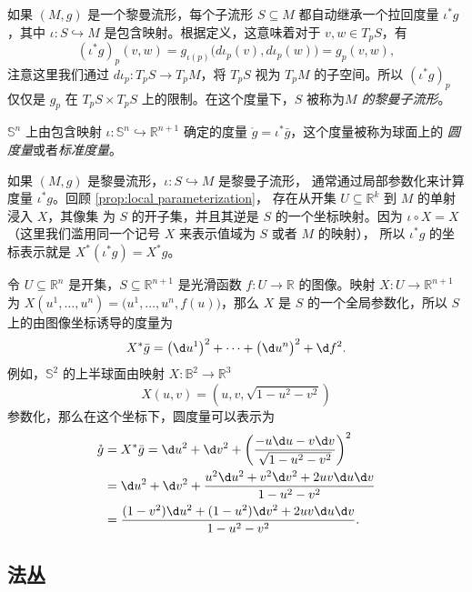 如果 $(M,g)$ 是一个黎曼流形，每个子流形 $S\subseteq M$
都自动继承一个拉回度量 $\iota^*g$，其中 $\iota:S\hookrightarrow M$
是包含映射。根据定义，这意味着对于 $v,w\in T_pS$，有
\[
  (\iota^*g)_p(v,w)=g_{\iota(p)}\bigl(d\iota_p(v),d\iota_p(w)\bigr)
  =g_p(v,w),
\]
注意这里我们通过 $d\iota_p:T_pS\to T_pM$，将 $T_pS$ 视为 $T_pM$
的子空间。所以 $(\iota^*g)_p$ 仅仅是 $g_p$ 在 $T_pS\times T_pS$
上的限制。在这个度量下，$S$ 被称为\emph{$M$ 的黎曼子流形}。

\begin{example}
  $\mathbb{S}^n$ 上由包含映射 $\iota:\mathbb{S}^n\hookrightarrow \mathbb{R}^{n+1}$
  确定的度量 $\mathring{g}=\iota^*\bar g$，这个度量被称为球面上的
  \emph{圆度量}或者\emph{标准度量}。
\end{example}

如果 $(M,g)$ 是黎曼流形，$\iota:S\hookrightarrow M$ 是黎曼子流形，
通常通过局部参数化来计算度量 $\iota^*g$。回顾 \autoref{prop:local parameterization}，
存在从开集 $U\subseteq \mathbb{R}^k$ 到 $M$ 的单射浸入 $X$，其像集
为 $S$ 的开子集，并且其逆是 $S$ 的一个坐标映射。因为 $\iota\circ X=X$
（这里我们滥用同一个记号 $X$ 来表示值域为 $S$ 或者 $M$ 的映射），
所以 $\iota^*g$ 的坐标表示就是 $X^*(\iota^*g)=X^*g$。

\begin{example}[图像坐标中的度量]
  令 $U\subseteq \mathbb{R}^n$ 是开集，$S\subseteq \mathbb{R}^{n+1}$
  是光滑函数 $f:U\to \mathbb{R}$ 的图像。映射 $X:U\to \mathbb{R}^{n+1}$
  为 $X(u^1,\dots,u^n)=\bigl(u^1,\dots,u^n,f(u)\bigr)$，那么 $X$
  是 $S$ 的一个全局参数化，所以 $S$ 上的由图像坐标诱导的度量为
  \[
    X^*\bar g=\bigl(\d u^1\bigr)^2+\cdots+\bigl(\d u^n\bigr)^2+\d f^2.
  \]
  例如，$\mathbb{S}^2$ 的上半球面由映射 $X:\mathbb{B}^2\to \mathbb{R}^3$
  \[
    X(u,v)=\left(u,v,\sqrt{1-u^2-v^2}\right)  
  \]
  参数化，那么在这个坐标下，圆度量可以表示为
  \begin{align*}
    \mathring{g}&=X^*\bar g=\d u^2+\d v^2+\left(\frac{-u\d u-v\d v}{\sqrt{1-u^2-v^2}}\right)^2\\
    &=\d u^2+\d v^2+\frac{u^2\d u^2+v^2\d v^2+2uv\d u\d v}{1-u^2-v^2}\\
    &=\frac{(1-v^2)\d u^2+(1-u^2)\d v^2+2uv\d u\d v}{1-u^2-v^2}.
  \end{align*}
\end{example}

\subsection{法丛}

